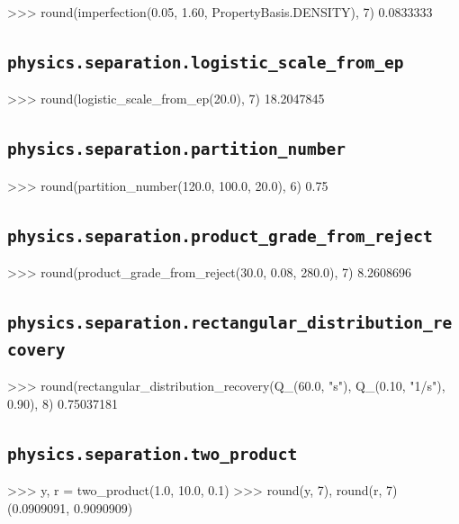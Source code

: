 \documentclass[10pt,a4paper,twoside]{report}
\begin{document}
\begin{doctestblock}
>>> round(imperfection(0.05, 1.60, PropertyBasis.DENSITY), 7)
0.0833333
\end{doctestblock}

\subsection*{\texttt{physics.separation.logistic\_scale\_from\_ep}}

\begin{doctestblock}
>>> round(logistic_scale_from_ep(20.0), 7)
18.2047845
\end{doctestblock}

\subsection*{\texttt{physics.separation.partition\_number}}

\begin{doctestblock}
>>> round(partition_number(120.0, 100.0, 20.0), 6)
0.75
\end{doctestblock}

\subsection*{\texttt{physics.separation.product\_grade\_from\_reject}}

\begin{doctestblock}
>>> round(product_grade_from_reject(30.0, 0.08, 280.0), 7)
8.2608696
\end{doctestblock}

\subsection*{\texttt{physics.separation.rectangular\_distribution\_recovery}}

\begin{doctestblock}
>>> round(rectangular_distribution_recovery(Q_(60.0, "s"), Q_(0.10, "1/s"), 0.90), 8)
0.75037181
\end{doctestblock}

\subsection*{\texttt{physics.separation.two\_product}}

\begin{doctestblock}
>>> y, r = two_product(1.0, 10.0, 0.1)
>>> round(y, 7), round(r, 7)
(0.0909091, 0.9090909)
\end{doctestblock}
\end{document}
